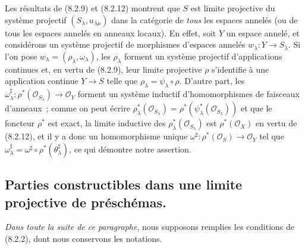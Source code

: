 \begin{remark}[8.2.14]
\label{IV.8.2.14-fr}
Les résultats de (8.2.9) et (8.2.12) montrent que $S$ est limite projective du
système projectif $(S_\lambda,u_{\lambda\mu})$ dans la catégorie de
\emph{tous} les espaces annelés (ou de tous les espaces annelés en anneaux
locaux). En effet, soit $Y$ un espace annelé, et considérons un système
projectif de morphismes d'espaces annelés $w_\lambda:Y\to S_\lambda$. Si
l'on pose $w_\lambda=(\rho_\lambda,\omega_\lambda)$, les $\rho_\lambda$
forment un système projectif d'applications continues et, en vertu de
(8.2.9), leur limite projective $\rho$ s'identifie à une application continue
$Y\to S$ telle que $\rho_\lambda=\psi_\lambda\circ\rho$. D'autre part, les
$\omega_\lambda^\sharp:
\rho^*(\mathcal O_{S_\lambda})\to\mathcal O_Y$
forment un système inductif d'homomorphismes de faisceaux d'anneaux~; comme
on peut écrire
$\rho_\lambda^*(\mathcal O_{S_\lambda})=
\rho^*(\psi_\lambda^*(\mathcal O_{S_\lambda}))$ et que le foncteur $\rho^*$
est exact, la limite inductive des
$\rho_\lambda^*(\mathcal O_{S_\lambda})$ est $\rho^*(\mathcal O_X)$ en
vertu de (8.2.12), et il y a donc un homomorphisme unique
$\omega^\sharp:\rho^*(\mathcal O_S)\to\mathcal O_Y$ tel que
$\omega_\lambda^\sharp=\omega^\sharp\circ
\rho^*(\theta_\lambda^\sharp)$, ce qui démontre notre assertion.
\end{remark}

\subsection{Parties constructibles dans une limite projective de préschémas.}
\label{subsection:IV.8.3-fr}

\begin{env}[8.3.1]
\label{IV.8.3.1-fr}
\emph{Dans toute la suite de ce paragraphe}, nous supposons remplies les conditions
de (8.2.2), dont nous conservons les notations.
\end{env}

